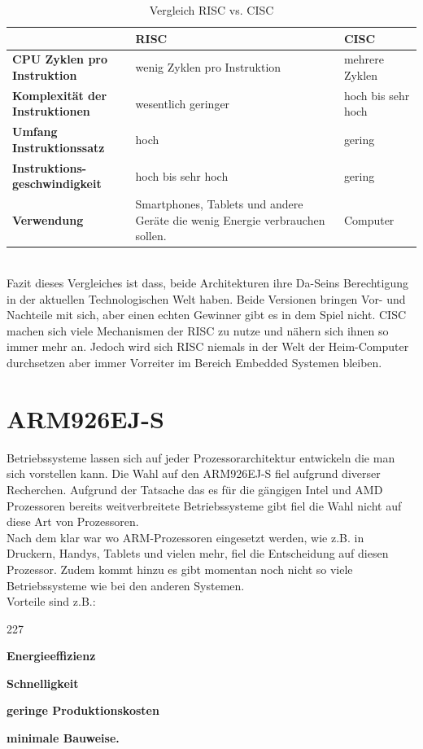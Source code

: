 \begin{table}[h!]
\centering
\begin{tabular}[h!]{|p{4cm}|p{4cm}|p{5cm}|}
	\cline{1-3} 
	& \textbf{RISC} & \textbf{CISC} \\ \hline 
	\textbf{CPU Zyklen pro \newline Instruktion} & wenig Zyklen pro Instruktion & mehrere Zyklen \\ \hline
	\textbf{Komplexit\"at der \newline Instruktionen} & wesentlich geringer & hoch bis sehr hoch\\ \hline
	\textbf{Umfang Instruktionssatz} & hoch & gering \\ \hline
	\textbf{Instruktions-\newline geschwindigkeit} &  hoch bis sehr hoch & gering \\ \hline
	\textbf{Verwendung}  & Smartphones, Tablets und andere Ger\"ate die wenig Energie verbrauchen sollen. & Computer \\ \hline	 
	
\end{tabular}
\caption{Vergleich RISC vs. CISC}
\end{table}
\\
\noindent
Fazit dieses Vergleiches ist dass, beide Architekturen ihre Da-Seins Berechtigung in der aktuellen Technologischen Welt haben. Beide Versionen bringen Vor- und Nachteile mit sich, aber einen echten Gewinner gibt es in dem Spiel nicht. CISC machen sich viele Mechanismen der RISC zu nutze und n\"ahern sich ihnen so immer mehr an. Jedoch wird sich RISC niemals in der Welt der Heim-Computer durchsetzen aber immer Vorreiter im Bereich Embedded Systemen bleiben.
\newpage
\section{ARM926EJ-S}
Betriebssysteme lassen sich auf jeder Prozessorarchitektur entwickeln die man sich vorstellen kann. Die Wahl auf den ARM926EJ-S fiel aufgrund diverser Recherchen. Aufgrund der Tatsache das es f\"ur die g\"angigen Intel und AMD Prozessoren bereits weitverbreitete Betriebssysteme gibt fiel die Wahl nicht auf diese Art von Prozessoren.\\
Nach dem klar war wo ARM-Prozessoren eingesetzt werden, wie z.B. in Druckern, Handys, Tablets und vielen mehr, fiel die Entscheidung auf diesen Prozessor. Zudem kommt hinzu es gibt momentan noch nicht so viele Betriebssysteme wie bei den anderen Systemen.\\ Vorteile sind z.B.:
\begin{dinglist}{227}
	\item{\textbf{Energieeffizienz}}
	\item{\textbf{Schnelligkeit}}
	\item{\textbf{geringe Produktionskosten}}
	\item{\textbf{minimale Bauweise.}}
\end{dinglist}
